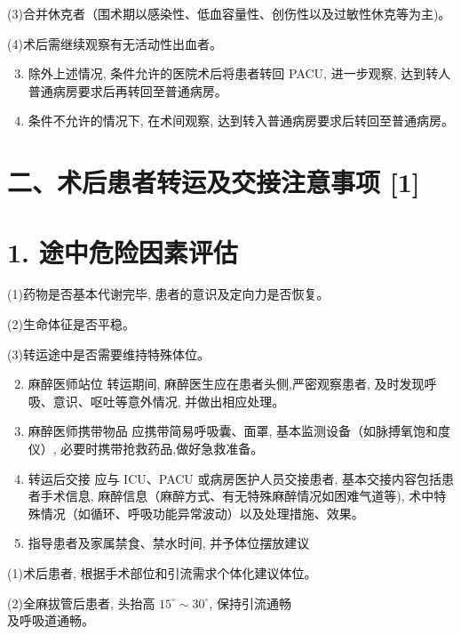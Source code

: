 \documentclass[10pt]{article}
\begin{document}
(3)合并休克者（围术期以感染性、低血容量性、创伤性以及过敏性休克等为主)。

(4)术后需继续观察有无活动性出血者。

\begin{enumerate}
  \setcounter{enumi}{2}
  \item 除外上述情况, 条件允许的医院术后将患者转回 PACU, 进一步观察, 达到转人普通病房要求后再转回至普通病房。

  \item 条件不允许的情况下, 在术间观察, 达到转入普通病房要求后转回至普通病房。

\end{enumerate}

\section*{二、术后患者转运及交接注意事项 [1]}
\section*{1. 途中危险因素评估}
(1)药物是否基本代谢完毕, 患者的意识及定向力是否恢复。

(2)生命体征是否平稳。

(3)转运途中是否需要维持特殊体位。

\begin{enumerate}
  \setcounter{enumi}{1}
  \item 麻醉医师站位 转运期间, 麻醉医生应在患者头侧,严密观察患者, 及时发现呼吸、意识、呕吐等意外情况, 并做出相应处理。

  \item 麻醉医师携带物品 应携带简易呼吸囊、面罩, 基本监测设备（如脉搏氧饱和度仪）, 必要时携带抢救药品,做好急救准备。

  \item 转运后交接 应与 ICU、PACU 或病房医护人员交接患者, 基本交接内容包括患者手术信息, 麻醉信息（麻醉方式、有无特殊麻醉情况如困难气道等), 术中特殊情况（如循环、呼吸功能异常波动）以及处理措施、效果。

  \item 指导患者及家属禁食、禁水时间, 并予体位摆放建议

\end{enumerate}

(1)术后患者, 根据手术部位和引流需求个体化建议体位。

(2)全麻拔管后患者, 头抬高 $15^{\circ} \sim 30^{\circ}$, 保持引流通畅\\
及呼吸道通畅。
\end{document}
